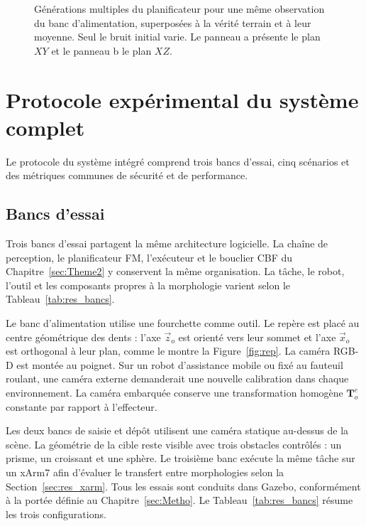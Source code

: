\begin{figure}[!htbp]
    \centering
    
    \caption[Générations multimodales du planificateur Flow Matching]{Générations multiples du planificateur pour une même observation du banc d'alimentation, superposées à la vérité terrain et à leur moyenne. Seul le bruit initial varie. Le panneau a présente le plan $XY$ et le panneau b le plan $XZ$.}\label{fig:fm_trajectoire_multimodale}
\end{figure}

\FloatBarrier
\section{Protocole expérimental du système complet}\label{sec:res_protocole}
Le protocole du système intégré comprend trois bancs d'essai, cinq scénarios et des métriques communes de sécurité et de performance.

\subsection{Bancs d'essai}\label{subsec:res_bancs}
Trois bancs d'essai partagent la même architecture logicielle. La chaîne de perception, le planificateur \ac{FM}, l'exécuteur et le bouclier \ac{CBF} du Chapitre~\ref{sec:Theme2} y conservent la même organisation. La tâche, le robot, l'outil et les composants propres à la morphologie varient selon le Tableau~\ref{tab:res_bancs}.

Le banc d'alimentation utilise une fourchette comme outil. Le repère est placé au centre géométrique des dents : l'axe $\vec{z}_o$ est orienté vers leur sommet et l'axe $\vec{x}_o$ est orthogonal à leur plan, comme le montre la Figure~\ref{fig:rep}. La caméra \ac{RGB-D} est montée au poignet. Sur un robot d'assistance mobile ou fixé au fauteuil roulant, une caméra externe demanderait une nouvelle calibration dans chaque environnement. La caméra embarquée conserve une transformation homogène $\mathbf{T}_o^e$ constante par rapport à l'effecteur.

Les deux bancs de saisie et dépôt utilisent une caméra statique au-dessus de la scène. La géométrie de la cible reste visible avec trois obstacles contrôlés : un prisme, un croissant et une sphère. Le troisième banc exécute la même tâche sur un xArm7 afin d'évaluer le transfert entre morphologies selon la Section~\ref{sec:res_xarm}. Tous les essais sont conduits dans Gazebo, conformément à la portée définie au Chapitre~\ref{sec:Metho}. Le Tableau~\ref{tab:res_bancs} résume les trois configurations.

